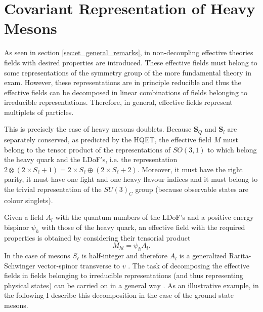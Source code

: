 \section{Covariant Representation of Heavy Mesons}

As seen in section \ref{sec:et_general_remarks}, in non-decoupling effective theories fields with desired properties are introduced. These effective fields must belong to some representations of the symmetry group of the more fundamental theory in exam. However, these representations are in principle reducible and thus the effective fields can be decomposed in linear combinations of fields belonging to irreducible representations. Therefore, in general, effective fields represent multiplets of particles.

This is precisely the case of heavy mesons doublets. Because $\symbf{S}_Q$ and $\symbf{S}_l$ are separately conserved, as predicted by the HQET, the effective field $M$ must belong to the tensor product of the representations of $SO(3,1)$ to which belong the heavy quark and the LDoF's, i.e. the representation $ 2 \otimes \left( 2 \times S_\ell + 1 \right) =  2 \times S_\ell \oplus \left( 2 \times S_\ell + 2 \right)$.
Moreover, it must have the right parity, it must have one light and one heavy flavour indices and it must belong to the trivial representation of the $SU(3)_C$ group (because observable states are colour singlets).


Given a field $A_l$ with the quantum numbers of the LDoF's and a positive energy bispinor $\psi_h$ with those of the heavy quark, an effective field with the required properties is obtained by considering their tensorial product
\begin{equation}
  M_{h l} = \psi_h A_l .
\end{equation}
In the case of mesons $S_\ell$ is half-integer and therefore $A_l$ is a generalized Rarita-Schwinger vector-spinor transverse to $v$ \cite{Falk:1991nq}. The task of decomposing the effective fields in fields belonging to irreducible representations (and thus representing physical states) can be carried on in a general way \cite{Falk:1991nq}. As an illustrative example, in the following I describe this decomposition in the case of the ground state mesons.

